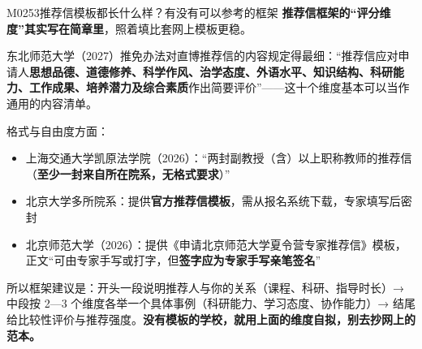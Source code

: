 \begin{qa}{M0253}{推荐信模板都长什么样？有没有可以参考的框架}
\textbf{推荐信框架的“评分维度”其实写在简章里}，照着填比套网上模板更稳。

东北师范大学（2027）推免办法对直博推荐信的内容规定得最细：“推荐信应对申请人\textbf{思想品德、道德修养、科学作风、治学态度、外语水平、知识结构、科研能力、工作成果、培养潜力及综合素质}作出简要评价”——这十个维度基本可以当作通用的内容清单。

格式与自由度方面：

\begin{itemize}
  \item 上海交通大学凯原法学院（2026）：“两封副教授（含）以上职称教师的推荐信（\textbf{至少一封来自所在院系，无格式要求}）”
  \item 北京大学多所院系：提供\textbf{官方推荐信模板}，需从报名系统下载，专家填写后密封
  \item 北京师范大学（2026）：提供《申请北京师范大学夏令营专家推荐信》模板，正文“可由专家手写或打字，但\textbf{签字应为专家手写亲笔签名}”
\end{itemize}

所以框架建议是：开头一段说明推荐人与你的关系（课程、科研、指导时长）→ 中段按 2—3 个维度各举一个具体事例（科研能力、学习态度、协作能力）→ 结尾给比较性评价与推荐强度。\textbf{没有模板的学校，就用上面的维度自拟，别去抄网上的范本。}
\end{qa}

